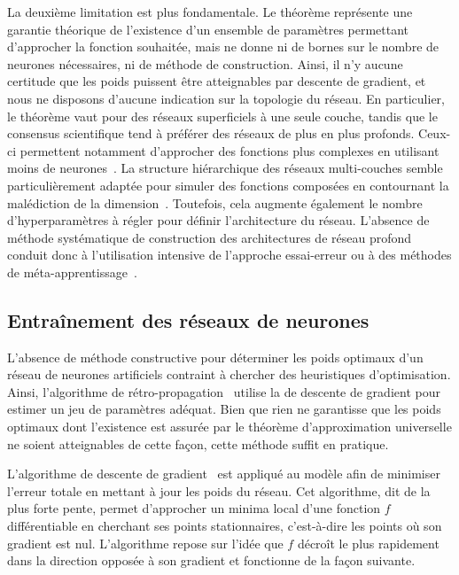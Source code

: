 La deuxième limitation est plus fondamentale. Le théorème représente une garantie théorique de l'existence d'un ensemble de paramètres permettant d'approcher la fonction souhaitée, mais ne donne ni de bornes sur le nombre de neurones nécessaires, ni de méthode de construction. Ainsi, il n'y aucune certitude que les poids puissent être atteignables par descente de gradient, et nous ne disposons d'aucune indication sur la topologie du réseau. En particulier, le théorème vaut pour des réseaux superficiels à une seule couche, tandis que le consensus scientifique tend à préférer des réseaux de plus en plus profonds. Ceux-ci permettent notamment d'approcher des fonctions plus complexes en utilisant moins de neurones~\cite{bianchini_complexity_2014,mhaskar_when_2017}. La structure hiérarchique des réseaux multi-couches semble particulièrement adaptée pour simuler des fonctions composées en contournant la malédiction de la dimension~\cite{poggio_why_2017}. Toutefois, cela augmente également le nombre d'hyperparamètres à régler pour définir l'architecture du réseau. L'absence de méthode systématique de construction des architectures de réseau profond conduit donc à l'utilisation intensive de l'approche essai-erreur ou à des méthodes de méta-apprentissage~\cite{zoph_neural_2016}.

\subsection{Entraînement des réseaux de neurones}

L'absence de méthode constructive pour déterminer les poids optimaux d'un réseau de neurones artificiels contraint à chercher des heuristiques d'optimisation. Ainsi, l'algorithme de rétro-propagation~\cite{werbos_beyond_1975,rumelhart_learning_1986,lecun_learning_1986} utilise la de descente de gradient pour estimer un jeu de paramètres adéquat. Bien que rien ne garantisse que les poids optimaux dont l'existence est assurée par le théorème d'approximation universelle ne soient atteignables de cette façon, cette méthode suffit en pratique.

L'algorithme de descente de gradient~\cite{cauchy_comptes_1847} est appliqué au modèle afin de minimiser l'erreur totale en mettant à jour les poids du réseau. Cet algorithme, dit de la plus forte pente, permet d'approcher un minima local d'une fonction $f$ différentiable en cherchant ses points stationnaires, c'est-à-dire les points où son gradient est nul. L'algorithme repose sur l'idée que $f$ décroît le plus rapidement dans la direction opposée à son gradient et fonctionne de la façon suivante.

